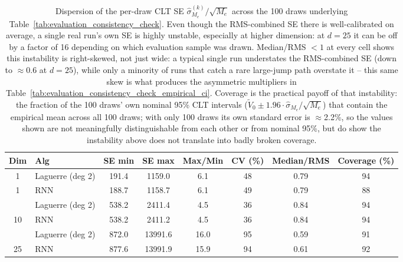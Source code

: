 \begin{table}

\caption{\label{tab:evaluation_consistency_check_dispersion}Dispersion of the per-draw CLT SE $\hat\sigma_{M_e}^{(k)}/\sqrt{M_e}$ across the 100 draws underlying Table~\ref{tab:evaluation_consistency_check}. Even though the RMS-combined SE there is well-calibrated on average, a single real run's own SE is highly unstable, especially at higher dimension: at $d=25$ it can be off by a factor of 16 depending on which evaluation sample was drawn. Median/RMS $<1$ at every cell shows this instability is right-skewed, not just wide: a typical single run understates the RMS-combined SE (down to $\approx$0.6 at $d=25$), while only a minority of runs that catch a rare large-jump path overstate it -- this same skew is what produces the asymmetric multipliers in Table~\ref{tab:evaluation_consistency_check_empirical_ci}. Coverage is the practical payoff of that instability: the fraction of the 100 draws' own nominal 95\% CLT intervals ($\tilde V_0 \pm 1.96 \cdot \hat\sigma_{M_e}/\sqrt{M_e}$) that contain the empirical mean across all 100 draws; with only 100 draws its own standard error is $\approx$2.2\%, so the values shown are not meaningfully distinguishable from each other or from nominal 95\%, but do show the instability above does not translate into badly broken coverage.}
\footnotesize
\setlength{\tabcolsep}{4pt}
\centering
\begin{tabular}[t]{clcccccc}
\toprule
Dim & Alg & SE min & SE max & Max/Min & CV (\%) & Median/RMS & Coverage (\%)\\
\midrule
1 & Laguerre (deg 2) & 191.4 & 1159.0 & 6.1 & 48 & 0.79 & 94\\
1 & RNN & 188.7 & 1158.7 & 6.1 & 49 & 0.79 & 88\\
\addlinespace
10 & Laguerre (deg 2) & 538.2 & 2411.4 & 4.5 & 36 & 0.84 & 94\\
10 & RNN & 538.2 & 2411.2 & 4.5 & 36 & 0.84 & 94\\
\addlinespace
25 & Laguerre (deg 2) & 872.0 & 13991.6 & 16.0 & 95 & 0.59 & 91\\
25 & RNN & 877.6 & 13991.9 & 15.9 & 94 & 0.61 & 92\\
\bottomrule
\end{tabular}
\end{table}
